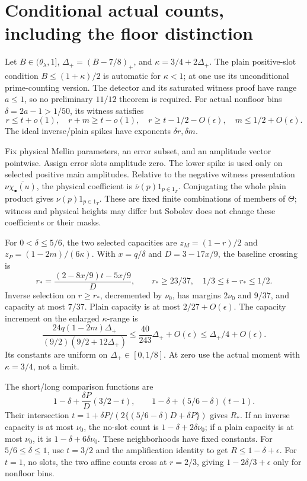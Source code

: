 \documentclass[12pt]{article}
\begin{document}
\section{Conditional actual counts, including the floor distinction}
Let \(B\in(\theta_\lambda,1]\),
\(\Delta_+=(B-7/8)_+\), and \(\kappa=3/4+2\Delta_+\).
The plain positive-slot condition \(B\le(1+\kappa)/2\) is automatic
for \(\kappa<1\); at one use its unconditional prime-counting
version.  The detector and its saturated witness proof have range
\(a\le1\), so no preliminary \(11/12\) theorem is required.
For actual nonfloor bins \(\delta=2a-1>1/50\), its witness
satisfies
\[
 r\le t+o(1),\quad r+m\ge t-o(1),\quad
 r\ge t-1/2-O(\epsilon),\quad m\le1/2+O(\epsilon).
\]
The ideal inverse/plain spikes have exponents \(\delta r,\delta m\).

Fix physical Mellin parameters, an error subset, and an amplitude
vector pointwise.  Assign error slots amplitude zero.  The lower
spike is used only on selected positive main amplitudes.
Relative to the negative witness presentation
\(\nu\overline{\chi_\bullet(u)}\), the physical coefficient is
\(\bar\nu(p)1_{p\in1_T}\).  Conjugating the whole plain product
gives \(\nu(p)1_{p\in1_T}\).  These are fixed finite combinations
of members of \(\Theta\); witness and physical heights may differ
but Sobolev does not change these coefficients or their masks.

For \(0<\delta\le5/6\), the two selected capacities are
\(z_M=(1-r)/2\) and \(z_P=(1-2m)/(6\kappa)\).
With \(x=q/\delta\) and \(D=3-17x/9\), the baseline crossing is
\[
 r_*=\frac{(2-8x/9)t-5x/9}{D},\qquad
 r_*\ge23/37,\quad 1/3\le t-r_*\le1/2.
\]
Inverse selection on \(r\ge r_*\), decremented by \(\nu_0\),
has margins \(2\nu_0\) and \(9/37\), and capacity at most \(7/37\).
Plain capacity is at most \(2/27+O(\epsilon)\).
The capacity increment on the enlarged \(\kappa\)-range is
\[
 \frac{24q(1-2m)\Delta_+}{(9/2)(9/2+12\Delta_+)}
 \le\frac{40}{243}\Delta_++O(\epsilon)
 \le\Delta_+/4+O(\epsilon).
\]
Its constants are uniform on \(\Delta_+\in[0,1/8]\).
At zero use the actual moment with \(\kappa=3/4\), not a limit.

The short/long comparison functions are
\[
 1-\delta+\frac{\delta P}{D}(3/2-t),\qquad
 1-\delta+(5/6-\delta)(t-1).
\]
Their intersection
\(t=1+\delta P/(2\{(5/6-\delta)D+\delta P\})\)
gives \(R_*\).  If an inverse capacity is at most \(\nu_0\),
the no-slot count is \(1-\delta+2\delta\nu_0\); if a plain
capacity is at most \(\nu_0\), it is \(1-\delta+6\delta\nu_0\).
These neighborhoods have fixed constants.
For \(5/6\le\delta\le1\), use \(t=3/2\) and the amplification
identity to get \(R\le1-\delta+\epsilon\).
For \(t=1\), no slots, the two affine counts cross at \(r=2/3\),
giving \(1-2\delta/3+\epsilon\) only for nonfloor bins.
\end{document}
